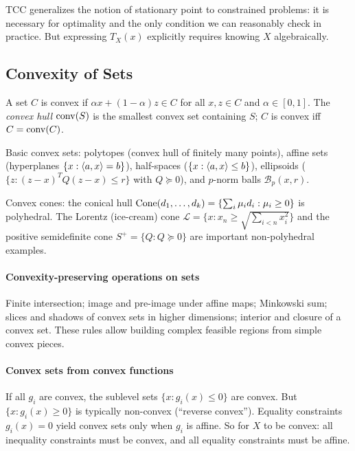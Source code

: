 TCC generalizes the notion of stationary point to constrained problems: it is necessary for optimality and the only condition we can reasonably check in practice.
But expressing $T_X(x)$ explicitly requires knowing $X$ algebraically.


\subsection{Convexity of Sets}\label{sec:convex-sets}

\begin{definition}\label{def:convex-set}
	A set $C$ is convex if $\alpha x + (1-\alpha)z \in C$ for all $x, z \in C$ and $\alpha \in [0,1]$.
	The \emph{convex hull} $\operatorname{conv}(S)$ is the smallest convex set containing $S$; $C$ is convex iff $C = \operatorname{conv}(C)$.
\end{definition}

Basic convex sets: polytopes (convex hull of finitely many points), affine sets (hyperplanes $\{x : \langle a, x\rangle = b\}$), half-spaces ($\{x : \langle a, x\rangle \leq b\}$), ellipsoids ($\{z : (z-x)^T Q (z-x) \leq r\}$ with $Q \succeq 0$), and $p$-norm balls $\mathcal{B}_p(x, r)$.

Convex cones: the conical hull $\operatorname{Cone}(d_1, \dots, d_k) = \{\sum_i \mu_i d_i : \mu_i \geq 0\}$ is polyhedral.
The Lorentz (ice-cream) cone $\mathcal{L} = \{x : x_n \geq \sqrt{\sum_{i<n} x_i^2}\}$ and the positive semidefinite cone $S^+ = \{Q : Q \succeq 0\}$ are important non-polyhedral examples.

\paragraph{Convexity-preserving operations on sets}

Finite intersection; image and pre-image under affine maps; Minkowski sum; slices and shadows of convex sets in higher dimensions; interior and closure of a convex set.
These rules allow building complex feasible regions from simple convex pieces.

\paragraph{Convex sets from convex functions}

If all $g_i$ are convex, the sublevel sets $\{x : g_i(x) \leq 0\}$ are convex.
But $\{x : g_i(x) \geq 0\}$ is typically non-convex (``reverse convex'').
Equality constraints $g_i(x) = 0$ yield convex sets only when $g_i$ is affine.
So for $X$ to be convex: all inequality constraints must be convex, and all equality constraints must be affine.


